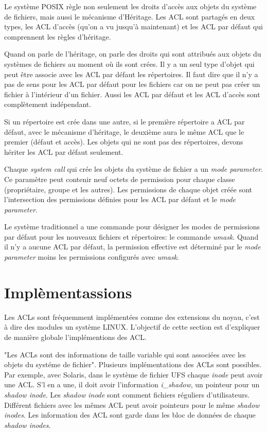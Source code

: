 Le système POSIX règle non seulement les droits d'accès aux objets du système de fichiers, mais aussi le mécanisme d'Héritage. Les ACL sont partagés en deux types, les 
ACL d'accès (qu'on a vu jusqu'à maintenant) et les ACL par défaut qui comprennent les règles d'héritage.
 
Quand on parle de l'héritage, on parle des droits qui sont attribués aux objets du systèmes de fichiers au moment où ils sont crées. Il y a un seul type d'objet qui peut être associe avec les ACL par défaut les répertoires. Il faut dire que il n'y a pas de sens pour les ACL par défaut pour les fichiers car on ne peut pas créer un fichier à l'intérieur d'un fichier. Aussi les ACL par défaut et les 
ACL d'accès sont complètement indépendant.
 
Si un répertoire est crée dans une autre, si le première répertoire a ACL par défaut, avec le mécanisme d'héritage, le deuxième aura le même ACL que le premier (défaut  et accès). Les objets qui ne sont pas des répertoires, devons hériter les ACL par défaut seulement.
 
Chaque \emph{system call} qui crée les objets du système de fichier a un \emph{mode parameter}. Ce paramètre peut contenir neuf octets de permission pour chaque classe (propriétaire, groupe et les autres). Les permissions de chaque objet créée sont l'intersection des permissions définies pour les ACL par défaut et le \emph{mode parameter}.
 
Le système traditionnel a une commande pour désigner les modes de permissions par défaut pour les nouveaux fichiers et répertoires: le commande \emph{umask}. Quand il n'y a aucune ACL par défaut, la permission effective est déterminé par le \emph{mode parameter} moins les permissions configurés avec \emph{umask}.
 \section{Implèmentassions}
 
Les ACLs sont fréquemment implémentées comme des extensions du noyau, c'est à dire des modules un système LINUX. L'objectif de cette section est d'expliquer de manière globale l'implémentions des ACL. 
 
"Les ACLs sont des informations de taille variable qui sont associées avec les objets du systéme de fichier"\cite{aclsuse}. Plusieurs implémentations des ACLs sont possibles. Par exemple, avec Solaris, dans le système de fichier UFS\cite{acl_permission} chaque \emph{inode} peut avoir une ACL. S'l en a une, il doit avoir l'information \emph{i\_shadow}, un pointeur pour un \emph{shadow inode}. Les \emph{shadow inode} sont comment fichiers réguliers d'utilisateurs. Différent fichiers avec les mêmes ACL peut avoir pointeurs pour le même \emph{shadow inodes}. Les information des ACL sont garde dans les bloc de données de chaque \emph{shadow inodes}.
 
